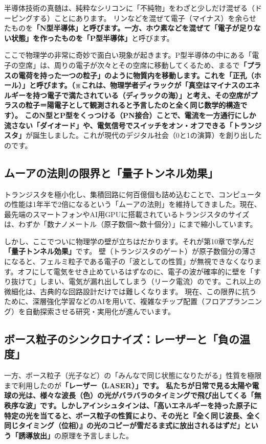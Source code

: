 半導体技術の真髄は、純粋なシリコンに「不純物」をわざと少しだけ混ぜる（ドーピングする）ことにあります。 リンなどを混ぜて電子（マイナス）を余らせたものを\textbf{「N型半導体」と呼びます。一方、ホウ素などを混ぜて「電子が足りない状態」を作ったものを「P型半導体」}と呼びます。

ここで物理学の非常に奇妙で面白い現象が起きます。P型半導体の中にある「電子の空席」は、周りの電子が次々とその空席に移動してくるため、まるで\textbf{「プラスの電荷を持った一つの粒子」のように物質内を移動します。これを「正孔（ホール）」と呼びます。（※これは、物理学者ディラックが「真空はマイナスのエネルギーを持つ電子で満たされている（ディラックの海）」と考え、その空席がプラスの粒子＝陽電子として観測されると予言したのと全く同じ数学的構造です）。 このN型とP型をくっつける（PN接合）ことで、電流を一方通行にしか流さない「ダイオード」や、電気信号でスイッチをオン・オフできる「トランジスタ」}が誕生しました。これが現代のデジタル社会（0と1の演算）を創り出したのです。

\subsection{ムーアの法則の限界と「量子トンネル効果」}

トランジスタを極小化し、集積回路に何百億個も詰め込むことで、コンピュータの性能は1年半で2倍になるという「ムーアの法則」を維持してきました。現在、最先端のスマートフォンやAI用GPUに搭載されているトランジスタのサイズは、わずか「数ナノメートル（原子数個〜数十個分）」にまで縮小しています。

しかし、ここでついに物理学の壁が立ちはだかります。それが第10章で学んだ\textbf{「量子トンネル効果」}です。 壁（トランジスタのゲート）が原子数個分の薄さになると、フェルミ粒子である電子の「波としての性質」が無視できなくなります。オフにして電気をせき止めているはずなのに、電子の波が確率的に壁を「すり抜けて」しまい、電気が漏れ出してしまう（リーク電流）のです。これ以上の微細化は、古典的な回路設計だけでは難しくなります。 現在、この限界に抗うために、深層強化学習などのAIを用いて、複雑なチップ配置（フロアプランニング）を自動探索させる研究・実用化が進んでいます。

\subsection{ボース粒子のシンクロナイズ：レーザーと「負の温度」}

一方、ボース粒子（光子など）の「みんなで同じ状態になりたがる」性質を極限まで利用したのが\textbf{「レーザー（LASER）」です。 私たちが日常で見る太陽や電球の光は、様々な波長（色）の光がバラバラのタイミングで飛び出してくる「無秩序な波」です。しかしアインシュタインは、「高いエネルギーを持った原子に特定の光を当てると、ボース粒子の性質により、その光と『全く同じ波長、全く同じタイミング（位相）』の光のコピーが雪だるま式に放出されるはずだ」という「誘導放出」}の原理を予言しました。

